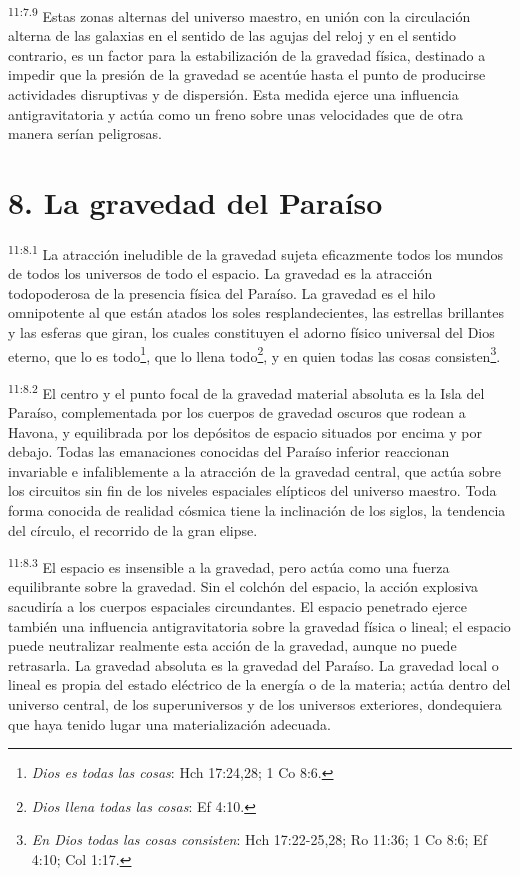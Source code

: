 \par
\textsuperscript{11:7.9} Estas zonas alternas del universo maestro, en unión con la circulación alterna de las galaxias en el sentido de las agujas del reloj y en el sentido contrario, es un factor para la estabilización de la gravedad física, destinado a impedir que la presión de la gravedad se acentúe hasta el punto de producirse actividades disruptivas y de dispersión. Esta medida ejerce una influencia antigravitatoria y actúa como un freno sobre unas velocidades que de otra manera serían peligrosas.

\section*{8. La gravedad del Paraíso}
\par
\textsuperscript{11:8.1} La atracción ineludible de la gravedad sujeta eficazmente todos los mundos de todos los universos de todo el espacio. La gravedad es la atracción todopoderosa de la presencia física del Paraíso. La gravedad es el hilo omnipotente al que están atados los soles resplandecientes, las estrellas brillantes y las esferas que giran, los cuales constituyen el adorno físico universal del Dios eterno, que lo es todo\footnote{\textit{Dios es todas las cosas}: Hch 17:24,28; 1 Co 8:6.}, que lo llena todo\footnote{\textit{Dios llena todas las cosas}: Ef 4:10.}, y en quien todas las cosas consisten\footnote{\textit{En Dios todas las cosas consisten}: Hch 17:22-25,28; Ro 11:36; 1 Co 8:6; Ef 4:10; Col 1:17.}.

\par
\textsuperscript{11:8.2} El centro y el punto focal de la gravedad material absoluta es la Isla del Paraíso, complementada por los cuerpos de gravedad oscuros que rodean a Havona, y equilibrada por los depósitos de espacio situados por encima y por debajo. Todas las emanaciones conocidas del Paraíso inferior reaccionan invariable e infaliblemente a la atracción de la gravedad central, que actúa sobre los circuitos sin fin de los niveles espaciales elípticos del universo maestro. Toda forma conocida de realidad cósmica tiene la inclinación de los siglos, la tendencia del círculo, el recorrido de la gran elipse.

\par
\textsuperscript{11:8.3} El espacio es insensible a la gravedad, pero actúa como una fuerza equilibrante sobre la gravedad. Sin el colchón del espacio, la acción explosiva sacudiría a los cuerpos espaciales circundantes. El espacio penetrado ejerce también una influencia antigravitatoria sobre la gravedad física o lineal; el espacio puede neutralizar realmente esta acción de la gravedad, aunque no puede retrasarla. La gravedad absoluta es la gravedad del Paraíso. La gravedad local o lineal es propia del estado eléctrico de la energía o de la materia; actúa dentro del universo central, de los superuniversos y de los universos exteriores, dondequiera que haya tenido lugar una materialización adecuada.

